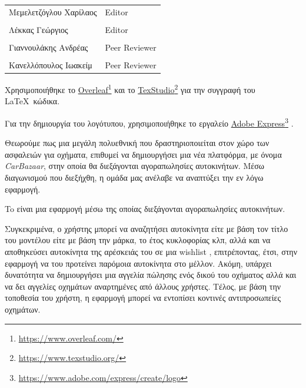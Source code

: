 \documentclass{../ol-softwaremanual}
\newcommand{\doclink}[2]{\href{#1}{#2}\footnote{\url{#1}}}
\begin{document}
	
	\vspace{40pt}
	
	\begin{table}[htbp!]
		\begin{tabular}{ll}
			Μεμελετζόγλου Χαρίλαος & \en Editor \\
			\\ Λέκκας Γεώργιος      &   \en  Editor \\
			\\ Γιαννουλάκης Ανδρέας & \en Peer Reviewer \\
			\\ Κανελλόπουλος Ιωακείμ & \en Peer Reviewer
		\end{tabular}
	\end{table}
	
	
	\vspace{40pt}
	
	
	\vspace{20pt}
	
	Χρησιμοποιήθηκε το \en \doclink{https://www.overleaf.com/}{Overleaf} \gr και το \en \doclink{https://www.texstudio.org/}{TexStudio} \gr για την συγγραφή του \LaTeX\ κώδικα. \break
	
	Για την δημιουργία του λογότυπου, χρησιμοποιήθηκε το εργαλείο \en \doclink{https://www.adobe.com/express/create/logo}{Adobe Express} . \gr
	
	
	\newpage
	
	
	\vspace{60pt}
	
	\flushleft
	
	Θεωρούμε πως μια μεγάλη πολυεθνική που δραστηριοποιείται στον χώρο των ασφαλειών για οχήματα, επιθυμεί να δημιουργήσει μια νέα πλατφόρμα, με όνομα  \en \textit{CarBazaar}\gr, στην οποία θα διεξάγονται αγοραπωλησίες αυτοκινήτων. Μέσω διαγωνισμού που διεξήχθη, η ομάδα μας ανέλαβε να αναπτύξει την εν λόγω εφαρμογή. \break
	
	To  \gr είναι μια εφαρμογή μέσω της οποίας διεξάγονται αγοραπωλησίες αυτοκινήτων. \hfill \break
	
	Συγκεκριμένα, ο χρήστης μπορεί να αναζητήσει αυτοκίνητα είτε με βάση τον τίτλο του μοντέλου είτε με βάση την μάρκα, το έτος κυκλοφορίας κλπ, αλλά και να αποθηκεύσει αυτοκίνητα της αρέσκειάς του σε μια \en wishlist \gr, επιτρέποντας, έτσι, στην εφαρμογή να του προτείνει παρόμοια αυτοκίνητα στο μέλλον.
	Ακόμη, υπάρχει δυνατότητα να δημιουργήσει μια αγγελία πώλησης ενός δικού του οχήματος αλλά και να δει αγγελίες οχημάτων αναρτημένες από άλλους χρήστες.
	Τέλος, με βάση την τοποθεσία του χρήστη, η εφαρμογή μπορεί να εντοπίσει κοντινές αντιπροσωπείες οχημάτων. \hfill \break
	
\end{document}
